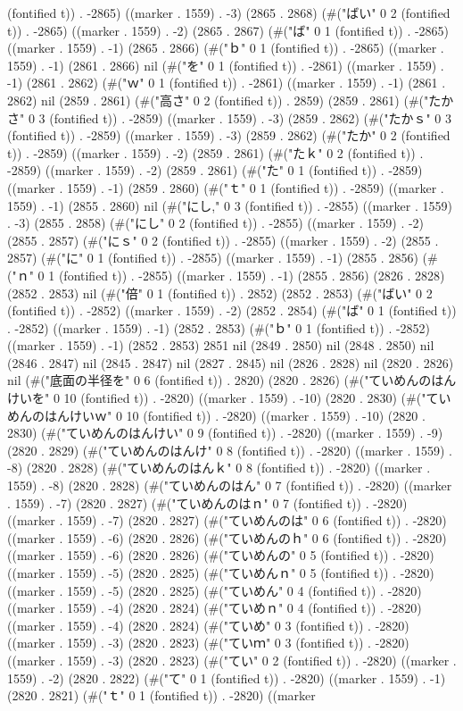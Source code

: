 {(fontified t)) . -2865) ((marker . 1559) . -3) (2865 . 2868) (#("ばい" 0 2 (fontified t)) . -2865) ((marker . 1559) . -2) (2865 . 2867) (#("ば" 0 1 (fontified t)) . -2865) ((marker . 1559) . -1) (2865 . 2866) (#("ｂ" 0 1 (fontified t)) . -2865) ((marker . 1559) . -1) (2861 . 2866) nil (#("を" 0 1 (fontified t)) . -2861) ((marker . 1559) . -1) (2861 . 2862) (#("ｗ" 0 1 (fontified t)) . -2861) ((marker . 1559) . -1) (2861 . 2862) nil (2859 . 2861) (#("高さ" 0 2 (fontified t)) . 2859) (2859 . 2861) (#("たかさ" 0 3 (fontified t)) . -2859) ((marker . 1559) . -3) (2859 . 2862) (#("たかｓ" 0 3 (fontified t)) . -2859) ((marker . 1559) . -3) (2859 . 2862) (#("たか" 0 2 (fontified t)) . -2859) ((marker . 1559) . -2) (2859 . 2861) (#("たｋ" 0 2 (fontified t)) . -2859) ((marker . 1559) . -2) (2859 . 2861) (#("た" 0 1 (fontified t)) . -2859) ((marker . 1559) . -1) (2859 . 2860) (#("ｔ" 0 1 (fontified t)) . -2859) ((marker . 1559) . -1) (2855 . 2860) nil (#("にし," 0 3 (fontified t)) . -2855) ((marker . 1559) . -3) (2855 . 2858) (#("にし" 0 2 (fontified t)) . -2855) ((marker . 1559) . -2) (2855 . 2857) (#("にｓ" 0 2 (fontified t)) . -2855) ((marker . 1559) . -2) (2855 . 2857) (#("に" 0 1 (fontified t)) . -2855) ((marker . 1559) . -1) (2855 . 2856) (#("ｎ" 0 1 (fontified t)) . -2855) ((marker . 1559) . -1) (2855 . 2856) (2826 . 2828) (2852 . 2853) nil (#("倍" 0 1 (fontified t)) . 2852) (2852 . 2853) (#("ばい" 0 2 (fontified t)) . -2852) ((marker . 1559) . -2) (2852 . 2854) (#("ば" 0 1 (fontified t)) . -2852) ((marker . 1559) . -1) (2852 . 2853) (#("ｂ" 0 1 (fontified t)) . -2852) ((marker . 1559) . -1) (2852 . 2853) 2851 nil (2849 . 2850) nil (2848 . 2850) nil (2846 . 2847) nil (2845 . 2847) nil (2827 . 2845) nil (2826 . 2828) nil (2820 . 2826) nil (#("底面の半径を" 0 6 (fontified t)) . 2820) (2820 . 2826) (#("ていめんのはんけいを" 0 10 (fontified t)) . -2820) ((marker . 1559) . -10) (2820 . 2830) (#("ていめんのはんけいｗ" 0 10 (fontified t)) . -2820) ((marker . 1559) . -10) (2820 . 2830) (#("ていめんのはんけい" 0 9 (fontified t)) . -2820) ((marker . 1559) . -9) (2820 . 2829) (#("ていめんのはんけ" 0 8 (fontified t)) . -2820) ((marker . 1559) . -8) (2820 . 2828) (#("ていめんのはんｋ" 0 8 (fontified t)) . -2820) ((marker . 1559) . -8) (2820 . 2828) (#("ていめんのはん" 0 7 (fontified t)) . -2820) ((marker . 1559) . -7) (2820 . 2827) (#("ていめんのはｎ" 0 7 (fontified t)) . -2820) ((marker . 1559) . -7) (2820 . 2827) (#("ていめんのは" 0 6 (fontified t)) . -2820) ((marker . 1559) . -6) (2820 . 2826) (#("ていめんのｈ" 0 6 (fontified t)) . -2820) ((marker . 1559) . -6) (2820 . 2826) (#("ていめんの" 0 5 (fontified t)) . -2820) ((marker . 1559) . -5) (2820 . 2825) (#("ていめんｎ" 0 5 (fontified t)) . -2820) ((marker . 1559) . -5) (2820 . 2825) (#("ていめん" 0 4 (fontified t)) . -2820) ((marker . 1559) . -4) (2820 . 2824) (#("ていめｎ" 0 4 (fontified t)) . -2820) ((marker . 1559) . -4) (2820 . 2824) (#("ていめ" 0 3 (fontified t)) . -2820) ((marker . 1559) . -3) (2820 . 2823) (#("ていｍ" 0 3 (fontified t)) . -2820) ((marker . 1559) . -3) (2820 . 2823) (#("てい" 0 2 (fontified t)) . -2820) ((marker . 1559) . -2) (2820 . 2822) (#("て" 0 1 (fontified t)) . -2820) ((marker . 1559) . -1) (2820 . 2821) (#("ｔ" 0 1 (fontified t)) . -2820) ((marker }
